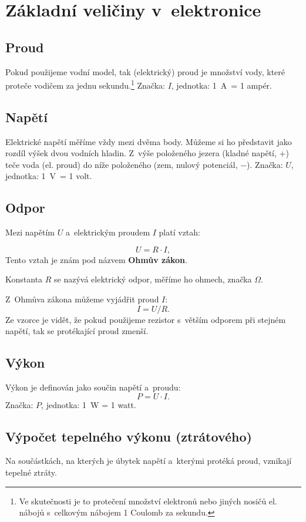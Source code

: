 \section{ Základní veličiny v~elektronice }

\subsection{Proud} 

Pokud použijeme vodní model, 
tak (elektrický) proud je množství vody, které proteče vodičem za jednu 
sekundu.\footnote{Ve skutečnosti je to protečení množství elektronů nebo jiných nosičů el. nábojů s~celkovým nábojem 1 Coulomb za sekundu.} 
Značka: $I$, jednotka: 1~A~= 1 ampér. 


\subsection{Napětí} 
Elektrické napětí měříme vždy mezi dvěma body. 
Můžeme si ho představit jako rozdíl výšek dvou vodních hladin. 
Z~výše položeného jezera (kladné napětí, +) teče voda (el. proud) do níže položeného (zem, nulový potenciál, $-$). 
Značka: $U$, jednotka: 1~V~= 1 volt.


\subsection{Odpor} 

Mezi napětím $U$ a~elektrickým proudem $I$ platí vztah:

$$U = R \cdot I,$$ 
Tento vztah je znám pod názvem {\bf Ohmův zákon}. 

Konstanta $R$ se nazývá elektrický odpor, měříme ho ohmech, značka $\Omega$. 

Z~Ohmůva zákona můžeme vyjádřit proud $ I $: 
$$ I = U / R .$$ Ze vzorce je vidět, že pokud použijeme rezistor s~větším odporem při stejném napětí, tak se protékající proud zmenší. 

\subsection{Výkon} 

Výkon je definován jako součin napětí a~proudu:
$$P = U \cdot I.$$ Značka: $P$, jednotka: 1~W = 1 watt.


\subsection{Výpočet tepelného výkonu (ztrátového)} 
Na součástkách, na kterých je úbytek napětí a~kterými protéká proud, vznikají 
  tepelné ztráty. 

